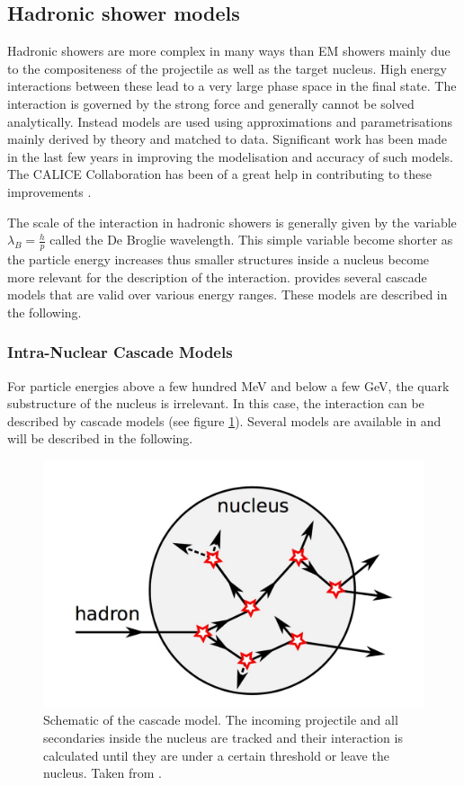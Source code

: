 \subsection{Hadronic shower models}

Hadronic showers are more complex in many ways than EM showers mainly due to the compositeness of the projectile as well as the target nucleus. High energy interactions between these lead to a very large phase space in the final state. The interaction is governed by the strong force and generally cannot be solved analytically. Instead models are used using approximations and parametrisations mainly derived by theory and matched to data. Significant work has been made in the last few years in improving the modelisation and accuracy of such models. The CALICE Collaboration has been of a great help in contributing to these improvements \cite{Adloff2013, Bilki2015}.

The scale of the interaction in hadronic showers is generally given by the variable $\lambda_{B} = \frac{h}{p}$ called the De Broglie wavelength. This simple variable become shorter as the particle energy increases thus smaller structures inside a nucleus become more relevant for the description of the interaction. \geant provides several cascade models that are valid over various energy ranges. These models are described in the following.

\subsubsection{Intra-Nuclear Cascade Models}

For particle energies above a few hundred MeV and below a few GeV, the quark substructure of the nucleus is irrelevant. In this case, the interaction can be described by cascade models (see figure \ref{fig:cascademodel}). Several models are available in \geant and will be described in the following.\\

\begin{figure}[htbp!]
  \centering
  \includegraphics[width=0.5\linewidth]{chap4/fig/CascadeModel.jpeg}
  \caption{Schematic of the cascade model. The incoming projectile and all secondaries inside the nucleus are tracked and their interaction is calculated until they are under a certain threshold or leave the nucleus. Taken from \cite{Feege2011}.} \label{fig:cascademodel}
\end{figure}

